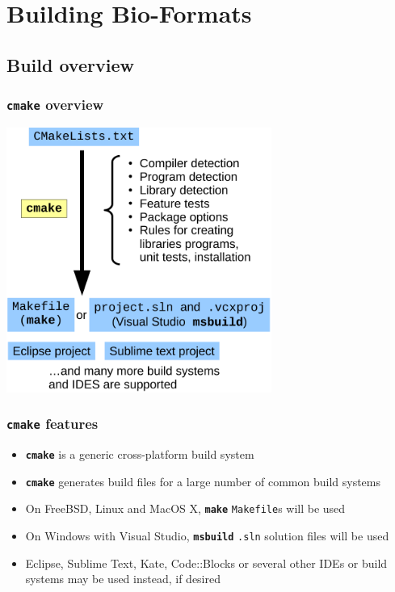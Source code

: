 \documentclass{beamer}
\newcommand{\cmd}[1]{\textbf{\texttt{#1}}}
\begin{document}
\section{Building Bio-Formats}

\subsection{Build overview}

\begin{frame}
  \frametitle{\cmd{cmake} overview}
  \medskip
  \centering
  \includegraphics[width=0.65\textwidth]{cmake-flow}
\end{frame}

\begin{frame}
  \frametitle{\cmd{cmake} features}

  \begin{itemize}
  \item \cmd{cmake} is a generic cross-platform build system
  \item \cmd{cmake} generates build files for a large number of common
    build systems
  \item On FreeBSD, Linux and MacOS X, \cmd{make} \texttt{Makefile}s will be used
  \item On Windows with Visual Studio, \cmd{msbuild} \texttt{.sln}
    solution files will be used
  \item Eclipse, Sublime Text, Kate, Code::Blocks or several other
    IDEs or build systems may be used instead, if desired
  \end{itemize}
\end{frame}
\end{document}
